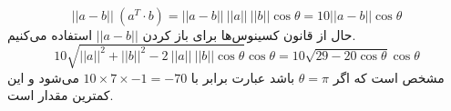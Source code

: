 \\
\begin{equation*}
    ||a-b|| ~ (a^T \cdot b) = ||a-b|| ~ ||a|| ~ ||b|| \cos \theta = 10 ||a-b|| \cos \theta
\end{equation*}
حال از قانون کسینوس‌ها برای باز کردن
$||a-b||$
استفاده می‌کنیم.
\begin{equation*}
    10 \sqrt{||a||^2 + ||b||^2 - 2 ~ ||a|| ~ ||b|| \cos \theta} \cos \theta =
    10 \sqrt{29 - 20 \cos \theta} \cos \theta
\end{equation*}
مشخص است که اگر
$\theta = \pi$
باشد عبارت برابر با
$10 \times 7 \times -1 = -70$
می‌شود و این کمترین مقدار است.